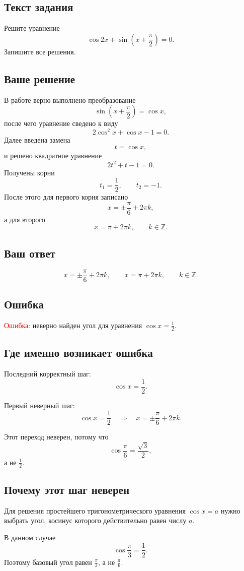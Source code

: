 \documentclass[12pt,a4paper]{article}
\newcommand{\errorlabel}[1]{\textcolor{red}{Ошибка:} #1}
\begin{document}
\subsection*{Текст задания}
Решите уравнение
\[
\cos 2x+\sin\left(x+\frac{\pi}{2}\right)=0.
\]
Запишите все решения.

\subsection*{Ваше решение}
В работе верно выполнено преобразование
\[
\sin\left(x+\frac{\pi}{2}\right)=\cos x,
\]
после чего уравнение сведено к виду
\[
2\cos^2x+\cos x-1=0.
\]
Далее введена замена
\[
t=\cos x,
\]
и решено квадратное уравнение
\[
2t^2+t-1=0.
\]
Получены корни
\[
t_1=\frac12,\qquad t_2=-1.
\]
После этого для первого корня записано
\[
x=\pm\frac{\pi}{6}+2\pi k,
\]
а для второго
\[
x=\pi+2\pi k,\qquad k\in\mathbb Z.
\]

\subsection*{Ваш ответ}
\[
x=\pm\frac{\pi}{6}+2\pi k,
\qquad
x=\pi+2\pi k,
\qquad k\in\mathbb Z.
\]

\subsection*{Ошибка}
\errorlabel{неверно найден угол для уравнения $\cos x=\frac12$.}

\subsection*{Где именно возникает ошибка}
Последний корректный шаг:
\[
\cos x=\frac12.
\]

Первый неверный шаг:
\[
\cos x=\frac12
\quad\Longrightarrow\quad
x=\pm\frac{\pi}{6}+2\pi k.
\]

Этот переход неверен, потому что
\[
\cos\frac{\pi}{6}=\frac{\sqrt3}{2},
\]
а не $\frac12$.

\subsection*{Почему этот шаг неверен}
Для решения простейшего тригонометрического уравнения $\cos x=a$ нужно выбрать угол, косинус которого действительно равен числу $a$.

В данном случае
\[
\cos\frac{\pi}{3}=\frac12.
\]
Поэтому базовый угол равен $\frac{\pi}{3}$, а не $\frac{\pi}{6}$.
\end{document}

